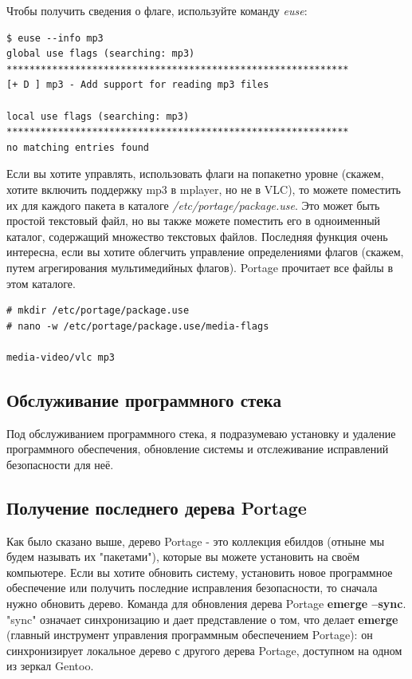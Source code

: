 \documentclass[10pt]{book}
\begin{document}
Чтобы получить сведения о флаге, используйте команду \textit{euse}:

\begin{tcolorbox}
\begin{lstlisting}
$ euse --info mp3
global use flags (searching: mp3)
************************************************************
[+ D ] mp3 - Add support for reading mp3 files

local use flags (searching: mp3)
************************************************************
no matching entries found
\end{lstlisting}
\end{tcolorbox}

Если вы хотите управлять, использовать флаги на попакетно уровне (скажем, хотите включить поддержку mp3 в mplayer, но не в VLC), то можете поместить их для каждого пакета в каталоге \textit{/etc/portage/package.use}.
Это может быть простой текстовый файл, но вы также можете поместить его в одноименный каталог, содержащий множество текстовых файлов. Последняя функция очень интересна, если вы хотите облегчить управление определениями флагов (скажем, путем агрегирования мультимедийных флагов). Portage прочитает все файлы в этом каталоге.

\begin{tcolorbox}
\begin{lstlisting}
# mkdir /etc/portage/package.use
# nano -w /etc/portage/package.use/media-flags

media-video/vlc mp3
\end{lstlisting}
\end{tcolorbox}

\subsection{Обслуживание программного стека}

Под обслуживанием программного стека, я подразумеваю установку и удаление программного обеспечения, обновление системы и отслеживание исправлений безопасности для неё.

\subsection{Получение последнего дерева Portage}

Как было сказано выше, дерево Portage - это коллекция ебилдов (отныне мы будем называть их "пакетами"), которые вы можете установить на своём компьютере. Если вы хотите обновить систему, установить новое программное обеспечение или получить последние исправления безопасности, то сначала нужно обновить дерево.
Команда для обновления дерева Portage \textbf{emerge --sync}. "sync" означает синхронизацию и дает  представление о том, что делает \textbf{emerge} (главный инструмент управления программным обеспечением Portage): он синхронизирует локальное дерево с другого дерева Portage, доступном на одном из зеркал Gentoo.
\end{document}
